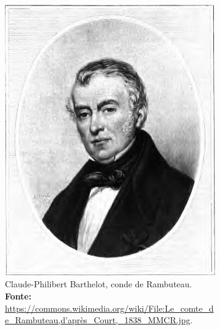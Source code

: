 \begin{figure}
\centering
\caption{Rambuteau e Haussmann, pioneiros do urbanismo e do planejamento urbano na França.}
\begin{footnotesize}
	\begin{subfigure}[b]{0.4\linewidth}
		\centering
		\includegraphics[width=1\textwidth]{2-cap1/complementos/fotos/Rambuteau.jpg} 
		\caption{Claude-Philibert Barthelot, conde de Rambuteau. \textbf{Fonte:} \url{https://commons.wikimedia.org/wiki/File:Le_comte_de_Rambuteau,d'après_Court,_1838_MMCR.jpg}.}
		\label{fig:rambuteau}
	\end{subfigure}	
	\
	\begin{subfigure}[b]{0.4\linewidth}
		\centering

\end{subfigure}
\end{footnotesize}
\end{figure}

